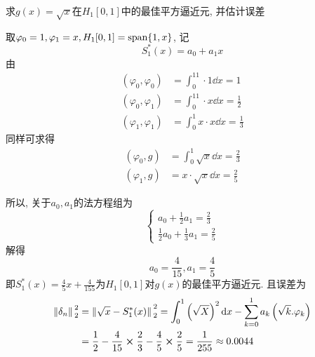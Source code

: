 \begin{example}
    求$g(x)=\sqrt{x}$在$H_1[0,1]$中的最佳平方逼近元, 并估计误差
\end{example}

\begin{solution}
    取$\varphi_0=1,\varphi_1=x, H_1[0,1]=\text{span}\{1,x\}$, 记
    \begin{equation*}
        S_1^*(x)=a_0+a_1x
    \end{equation*}
    由
    \begin{align*}
        (\varphi_0,\varphi_0)&=\int_0^11\cdot1\dd{x}=1\\
        (\varphi_0,\varphi_1)&=\int_0^11\cdot x\dd{x}=\frac{1}{2}\\
        (\varphi_1,\varphi_1)&=\int_0^1x\cdot x\dd{x}=\frac{1}{3}
    \end{align*}
    同样可求得
    \begin{align*}
        (\varphi_0,g)&=\int_0^1\sqrt{x}\dd{x}=\frac{2}{3}\\
        (\varphi_1,g)&=x\cdot\sqrt{x}\dd{x}=\frac{2}{5}
    \end{align*}

    所以, 关于$a_0,a_1$的法方程组为
    \begin{equation*}
        \begin{cases}
            a_0+\frac{1}{2}a_1=\frac{2}{3}\\
            \frac{1}{2}a_0+\frac{1}{3}a_1=\frac{2}{5}
        \end{cases}
    \end{equation*}
    解得
    \begin{equation*}
        a_0=\frac{4}{15}, a_1=\frac{4}{5}
    \end{equation*}
    即$S_1^*(x)=\frac{4}{5}x+\frac{4}{155}$为$H_1[0,1]$对$g(x)$的最佳平方逼近元. 且误差为
    \begin{align*}
        \norm*{\delta_n}_2^2&=\norm*{\sqrt{x}-S_1^*(x)}_2^2=\int_0^1\left(\sqrt{X}\right)^2\dd{x}-\sum_{k=0}^1a_k\left(\sqrt{k}.\varphi_k\right)\\
        &=\frac{1}{2}-\frac{4}{15}\cross\frac{2}{3}-\frac{4}{5}\cross\frac{2}{5}=\frac{1}{255}\approx0.0044
    \end{align*}
\end{solution}